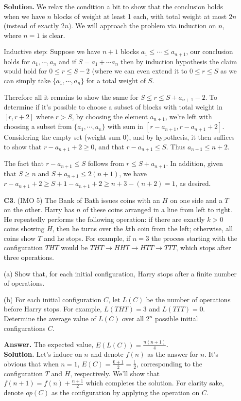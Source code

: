 \documentclass[11pt,a4paper]{article}
\begin{document}
\begin{enumerate}
	\textbf{Solution.} We relax the condition a bit to show that the conclusion holds when we have $n$ blocks of weight at least 1 each, with total weight at most $2n$ (instead of exactly $2n$). 
	We will approach the problem via induction on $n$, where $n=1$ is clear. 
	
	Inductive step: Suppose we have $n+1$ blocks $a_1\le \cdots \le a_{n+1}$, our conclusion holds for $a_1, \cdots , a_n$ and if $S=a_1+\cdots a_n$ then by induction hypothesis the claim would hold for $0\le r\le S-2$ (where we can even extend it to $0\le r\le S$ as we can simply take $\{a_1, \cdots, a_n\}$ for a total weight of $S$.
	
	Therefore all it remains to show the same for $S\le r\le S+a_{n+1}-2$. To determine if it's possible to choose a subset of blocks with total weight in $[r, r+2]$ where $r>S$, by choosing the element $a_{n+1}$, we're left with choosing a subset from $\{a_1, \cdots , a_n\}$ with sum in $[r-a_{n+1}, r-a_{n+1}+2]$. Considering the empty set (weight sum 0), and by hypothesis, it then suffices to show that $r-a_{n+1}+2\ge 0$, and that $r-a_{n+1}\le S$. Thus $a_{n+1}\le n+2$.
	
	The fact that $r-a_{n+1}\le S$ follows from $r\le S+a_{n+1}$. In addition, given that $S\ge n$ and $S+a_{n+1}\le 2(n+1)$, we have $r-a_{n+1}+2\ge S+1-a_{n+1}+2\ge n+3-(n+2)=1$, as desired.
	
	\item [\textbf{C3}.] (IMO 5) The Bank of Bath issues coins with an $H$ on one side and a $T$ on the other. Harry has $n$ of these coins arranged in a line from left to right. He repeatedly performs the following operation: if there are exactly $k>0$ coins showing $H$, then he turns over the $k$th coin from the left; otherwise, all coins show $T$ and he stops. For example, if $n=3$ the process starting with the configuration $THT$ would be $THT \to HHT  \to HTT \to TTT$, which stops after three operations.
	
	(a) Show that, for each initial configuration, Harry stops after a finite number of operations.
	
	(b) For each initial configuration $C$, let $L(C)$ be the number of operations before Harry stops. For example, $L(THT) = 3$ and $L(TTT) = 0$. Determine the average value of $L(C)$ over all $2^n$ possible initial configurations $C$.
	
	\textbf{Answer.} The expected value, $E(L(C))=\frac{n(n+1)}{4}$. \\
	\textbf{Solution.} Let's induce on $n$ and denote $f(n)$ as the answer for $n$. It's obvious that when $n=1$, $E(C)=\frac{0+1}{2}=\frac 12$, corresponding to the configuration $T$ and $H$, respectively. We'll show that $f(n+1)=f(n)+\frac{n+1}{2}$ which completes the solution. 
	For clarity sake, denote $op(C)$ as the configuration by applying the operation on $C$. 
	

\end{enumerate}
\end{document}

